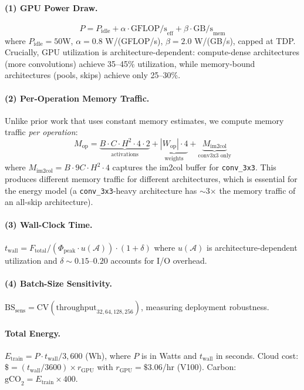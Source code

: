 \documentclass[10pt,twocolumn,letterpaper]{article}
\begin{document}
\paragraph{(1) GPU Power Draw.}
\begin{equation}
P = P_{\text{idle}} + \alpha \cdot \text{GFLOP/s}_{\text{eff}} + \beta \cdot \text{GB/s}_{\text{mem}}
\label{eq:power}
\end{equation}
where $P_{\text{idle}} = 50$W, $\alpha = 0.8$ W/(GFLOP/s), $\beta = 2.0$ W/(GB/s), capped at TDP. Crucially, GPU utilization is architecture-dependent: compute-dense architectures (more convolutions) achieve 35--45\% utilization, while memory-bound architectures (pools, skips) achieve only 25--30\%.

\paragraph{(2) Per-Operation Memory Traffic.}
Unlike prior work that uses constant memory estimates, we compute memory traffic \emph{per operation}:
\begin{equation}
M_{\text{op}} = \underbrace{B \cdot C \cdot H^2 \cdot 4 \cdot 2}_{\text{activations}} + \underbrace{|W_{\text{op}}| \cdot 4}_{\text{weights}} + \underbrace{M_{\text{im2col}}}_{\text{conv3x3 only}}
\end{equation}
where $M_{\text{im2col}} = B \cdot 9C \cdot H^2 \cdot 4$ captures the im2col buffer for \texttt{conv\_3x3}. This produces different memory traffic for different architectures, which is essential for the energy model (a \texttt{conv\_3x3}-heavy architecture has $\sim$3$\times$ the memory traffic of an all-skip architecture).

\paragraph{(3) Wall-Clock Time.}
$t_{\text{wall}} = F_{\text{total}} / (\Phi_{\text{peak}} \cdot u(\mathcal{A})) \cdot (1 + \delta)$
where $u(\mathcal{A})$ is architecture-dependent utilization and $\delta \sim 0.15\text{--}0.20$ accounts for I/O overhead.

\paragraph{(4) Batch-Size Sensitivity.}
$\text{BS}_{\text{sens}} = \text{CV}(\text{throughput}_{32, 64, 128, 256})$, measuring deployment robustness.

\paragraph{Total Energy.}
$E_{\text{train}} = P \cdot t_{\text{wall}} / 3{,}600$ (Wh), where $P$ is in Watts and $t_{\text{wall}}$ in seconds. Cloud cost: $\$ = (t_{\text{wall}} / 3600) \times r_{\text{GPU}}$ with $r_{\text{GPU}} = \$3.06$/hr (V100). Carbon: $\text{gCO}_2 = E_{\text{train}} \times 400$.
\end{document}
